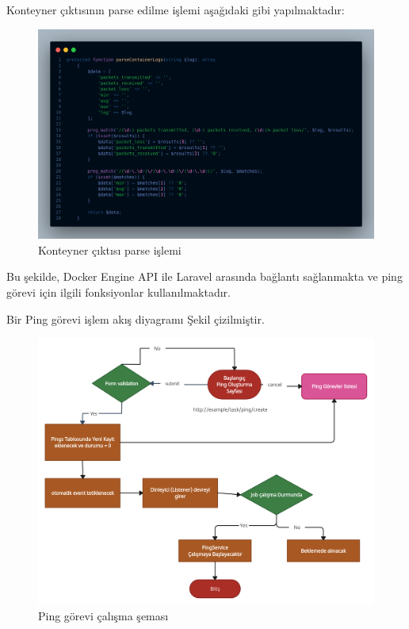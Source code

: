 Konteyner çıktısının parse edilme işlemi aşağıdaki gibi yapılmaktadır:

\begin{figure}[H]
	\centering
	\includegraphics[width=0.8\linewidth]{images/code_parse.png}
	\caption{Konteyner çıktısı parse işlemi}
	\label{fig:container_parse}
\end{figure}

Bu şekilde, Docker Engine API ile Laravel arasında bağlantı sağlanmakta ve ping görevi için ilgili fonksiyonlar kullanılmaktadır.

Bir Ping görevi işlem akış diyagramı Şekil çizilmiştir.
\begin{figure}[H]
	\centering
	\includegraphics[width=1.1\linewidth]{images/ping_task_diagram.png}
	\caption{Ping görevi çalışma şeması}
	\label{fig:ping_task_diagram}
\end{figure}


